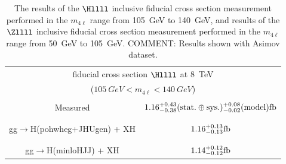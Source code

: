 \begin{table}[!h!tb]
\begin{center}
      \caption{
The results of the $\Hllll$ inclusive fiducial cross section measurement performed in the $m_{4\ell}$ range from 105~GeV to 140~GeV, and
results of the $\Zllll$ inclusive fiducial cross section measurement performed in the $m_{4\ell}$ range from 50~GeV to 105~GeV.
    COMMENT: Results shown with Asimov dataset.
        } \label{tab:incresultsPAS-asimov}
\begin{tabular}{|c|c|}
\hline %
\hline %
\multicolumn{2}{|c|}{fiducial cross section $\Hllll$ at 8~TeV } \\
\multicolumn{2}{|c|}{($105~GeV < m_{4\ell} < 140~GeV$)} \\
\hline %
\vspace{-0.4cm} & \\
Measured & $1.16^{+0.43}_{-0.38}({\rm stat.}\oplus{\rm sys.})^{+0.08}_{-0.02}({\rm model}) {\rm fb}$  \\ 
\vspace{-0.4cm} & \\
\hline %
\vspace{-0.4cm} & \\
\small gg$\rightarrow$H({\sc pohwheg+JHUgen}) + XH & $1.16^{+0.13}_{-0.13} {\rm fb}$ \\ 
\vspace{-0.4cm} & \\
\hline %
\vspace{-0.4cm} & \\
\small gg$\rightarrow$H({\sc minloHJJ}) + XH & $1.14^{+0.12}_{-0.12} {\rm fb}$ \\ 
\hline %
\hline %


\end{tabular}
\end{center}
\end{table}
